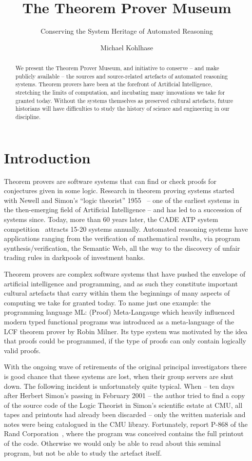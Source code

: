 \documentclass[smallcondensed]{svjour3}
\title{The Theorem Prover Museum}
\subtitle{Conserving the System Heritage of Automated Reasoning}
\author{Michael Kohlhase}
\institute{Computer Science, FAU Erlangen-N\"urnberg\\\url{http://kwarc.info/kohlhase}}
\begin{document}
\maketitle
\begin{abstract}
  We present the Theorem Prover Museum, and initiative to conserve -- and make publicly
  available -- the sources and source-related artefacts of automated reasoning systems.
  Theorem provers have been at the forefront of Artificial Intelligence, stretching the
  limits of computation, and incubating many innovations we take for granted
  today. Without the systems themselves as preserved cultural artefacts, future historians
  will have difficulties to study the history of science and engineering in our
  discipline.  
\end{abstract}
\section{Introduction}\label{sec:intro}

Theorem provers are software systems that can find or check proofs for conjectures given
in some logic. Research in theorem proving systems started with Newell and Simon's ``logic
theorist'' 1955~\cite{NewSim:ltmcips56} -- one of the earliest systems in the
then-emerging field of Artificial Intelligence -- and has led to a succession of systems
since. Today, more than 60 years later, the CADE ATP system competition~\cite{CASC}
attracts 15-20 systems annually. Automated reasoning systems have applications ranging
from the verification of mathematical results, via program synthesis/verification, the
Semantic Web, all the way to the discovery of unfair trading rules in darkpools of
investment banks.

Theorem provers are complex software systems that have pushed the envelope of artificial
intelligence and programming, and as such they constitute important cultural artefacts
that carry within them the beginnings of many aspects of computing we take for granted
today. To name just one example: the programming language ML: (Proof) Meta-Langauge which
heavily influenced modern typed functional programs was introduced as a meta-language of
the LCF theorem prover by Robin Milner. Its type system was motivated by the idea that
proofs could be programmed, if the type of proofs can only contain logically valid
proofs.

With the ongoing wave of retirements of the original principal investigators there is good
chance that these systems are lost, when their group servers are shut down. The following
incident is unfortunately quite typical. When -- ten days after Herbert Simon's passing in
February 2001 -- the author tried to find a copy of the source code of the Logic Theorist
in Simon's scientific estate at CMU, all tapes and printouts had already been discarded --
only the written materials and notes were being catalogued in the CMU
library. Fortunately, report P-868 of the Rand Corporation~\cite{NewSim:ltmcips56}, where
the program was conceived contains the full printout of the code. Otherwise we would only
be able to read about this seminal program, but not be able to study the artefact
itself. 
\end{document}
